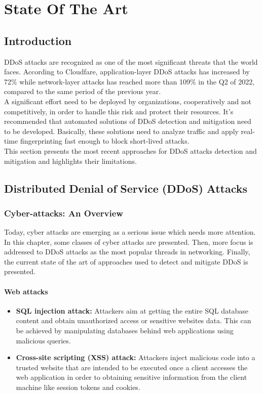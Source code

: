 \chapter{State Of The Art}
\label{chapter:chap2}


\section{Introduction}

DDoS attacks are recognized as one of the most significant threats that the world faces. According to Cloudfare, application-layer DDoS attacks has increased by 72\%  while network-layer attacks has reached more than 109\% in the Q2 of 2022, compared to the same period of the previous year. \\A significant effort need to be deployed  by organizations, cooperatively and not competitively, in order to handle this risk and protect their resources. It’s recommended that automated solutions of DDoS detection and mitigation need to be developed. Basically,  these solutions need to analyze traffic and apply real-time fingerprinting fast enough to block short-lived attacks. \\ This section presents the most recent approaches for DDoS attacks detection and mitigation and highlights their limitations.
\section{Distributed\textcolor{white}{.}Denial\textcolor{white}{.}of\textcolor{white}{.}Service\textcolor{white}{.}(DDoS)\textcolor{white}{.}Attacks}
\label{ddossoa}

\subsection{Cyber-attacks: An Overview}
Today, cyber attacks are emerging as a serious issue which needs more attention. In this chapter, some classes of cyber attacks are presented. Then, more focus is addressed to DDoS attacks as the most popular threads in networking. Finally, the current state of the art of approaches used to detect and mitigate DDoS is presented.


\subsubsection{Web attacks}
\begin{itemize}
    \item \textbf{SQL injection attack:} Attackers aim at getting the entire SQL database content and obtain unauthorized access or sensitive websites data. This can be achieved by manipulating databases behind web applications using malicious queries. 
    \item \textbf{Cross-site scripting (XSS) attack:}  Attackers inject malicious code into a trusted website that are intended to be executed once a client accesses the web application in order to obtaining sensitive information from the client machine like session tokens and cookies.
\end{itemize}



